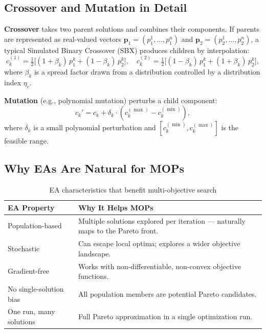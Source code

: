 \documentclass[12pt,a4paper]{article}
\begin{document}
\subsection{Crossover and Mutation in Detail}

\textbf{Crossover} takes two parent solutions and combines their components. If parents are represented as real-valued vectors $\mathbf{p}_1 = (p_1^1, \ldots, p_1^n)$ and $\mathbf{p}_2 = (p_2^1, \ldots, p_2^n)$, a typical Simulated Binary Crossover (SBX) produces children by interpolation:
\begin{equation}
    c_k^{(1)} = \tfrac{1}{2}\bigl[(1 + \beta_k)\,p_1^k + (1 - \beta_k)\,p_2^k\bigr],
    \quad
    c_k^{(2)} = \tfrac{1}{2}\bigl[(1 - \beta_k)\,p_1^k + (1 + \beta_k)\,p_2^k\bigr],
\end{equation}
where $\beta_k$ is a spread factor drawn from a distribution controlled by a distribution index $\eta_c$.

\textbf{Mutation} (e.g., polynomial mutation) perturbs a child component:
\begin{equation}
    c_k' = c_k + \delta_k \cdot (c_k^{(\max)} - c_k^{(\min)}),
\end{equation}
where $\delta_k$ is a small polynomial perturbation and $[c_k^{(\min)}, c_k^{(\max)}]$ is the feasible range.

\subsection{Why EAs Are Natural for MOPs}

\begin{table}[H]
\centering
\caption{EA characteristics that benefit multi-objective search}
\label{tab:ea_moea}
\renewcommand{\arraystretch}{1.3}
\begin{tabular}{p{4.5cm} p{9cm}}
\toprule
\textbf{EA Property} & \textbf{Why It Helps MOPs} \\
\midrule
Population-based & Multiple solutions explored per iteration --- naturally maps to the Pareto front. \\
Stochastic & Can escape local optima; explores a wider objective landscape. \\
Gradient-free & Works with non-differentiable, non-convex objective functions. \\
No single-solution bias & All population members are potential Pareto candidates. \\
One run, many solutions & Full Pareto approximation in a single optimization run. \\
\bottomrule
\end{tabular}
\end{table}
\end{document}
